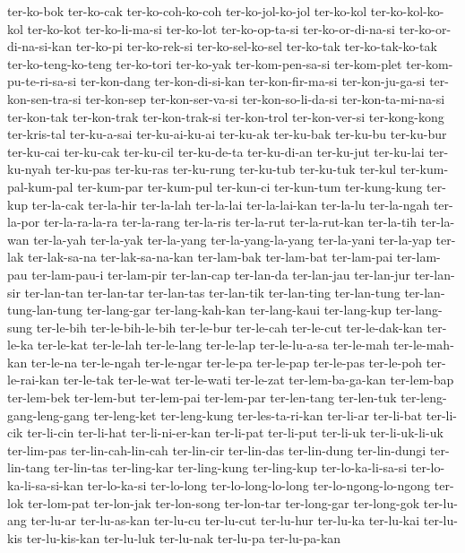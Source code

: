 {ter-ko-bok ter-ko-cak ter-ko-coh-ko-coh ter-ko-jol-ko-jol ter-ko-kol
ter-ko-kol-ko-kol ter-ko-kot ter-ko-li-ma-si ter-ko-lot ter-ko-op-ta-si
ter-ko-or-di-na-si ter-ko-or-di-na-si-kan ter-ko-pi ter-ko-rek-si
ter-ko-sel-ko-sel ter-ko-tak ter-ko-tak-ko-tak ter-ko-teng-ko-teng
ter-ko-tori ter-ko-yak ter-kom-pen-sa-si ter-kom-plet
ter-kom-pu-te-ri-sa-si ter-kon-dang ter-kon-di-si-kan ter-kon-fir-ma-si
ter-kon-ju-ga-si ter-kon-sen-tra-si ter-kon-sep ter-kon-ser-va-si
ter-kon-so-li-da-si ter-kon-ta-mi-na-si ter-kon-tak ter-kon-trak
ter-kon-trak-si ter-kon-trol ter-kon-ver-si ter-kong-kong ter-kris-tal
ter-ku-a-sai ter-ku-ai-ku-ai ter-ku-ak ter-ku-bak ter-ku-bu ter-ku-bur
ter-ku-cai ter-ku-cak ter-ku-cil ter-ku-de-ta ter-ku-di-an ter-ku-jut
ter-ku-lai ter-ku-nyah ter-ku-pas ter-ku-ras ter-ku-rung ter-ku-tub
ter-ku-tuk ter-kul ter-kum-pal-kum-pal ter-kum-par ter-kum-pul ter-kun-ci
ter-kun-tum ter-kung-kung ter-kup ter-la-cak ter-la-hir ter-la-lah
ter-la-lai ter-la-lai-kan ter-la-lu ter-la-ngah ter-la-por ter-la-ra-la-ra
ter-la-rang ter-la-ris ter-la-rut ter-la-rut-kan ter-la-tih ter-la-wan
ter-la-yah ter-la-yak ter-la-yang ter-la-yang-la-yang ter-la-yani
ter-la-yap ter-lak ter-lak-sa-na ter-lak-sa-na-kan ter-lam-bak ter-lam-bat
ter-lam-pai ter-lam-pau ter-lam-pau-i ter-lam-pir ter-lan-cap ter-lan-da
ter-lan-jau ter-lan-jur ter-lan-sir ter-lan-tan ter-lan-tar ter-lan-tas
ter-lan-tik ter-lan-ting ter-lan-tung ter-lan-tung-lan-tung ter-lang-gar
ter-lang-kah-kan ter-lang-kaui ter-lang-kup ter-lang-sung ter-le-bih
ter-le-bih-le-bih ter-le-bur ter-le-cah ter-le-cut ter-le-dak-kan
ter-le-ka ter-le-kat ter-le-lah ter-le-lang ter-le-lap ter-le-lu-a-sa
ter-le-mah ter-le-mah-kan ter-le-na ter-le-ngah ter-le-ngar ter-le-pa
ter-le-pap ter-le-pas ter-le-poh ter-le-rai-kan ter-le-tak ter-le-wat
ter-le-wati ter-le-zat ter-lem-ba-ga-kan ter-lem-bap ter-lem-bek
ter-lem-but ter-lem-pai ter-lem-par ter-len-tang ter-len-tuk
ter-leng-gang-leng-gang ter-leng-ket ter-leng-kung ter-les-ta-ri-kan
ter-li-ar ter-li-bat ter-li-cik ter-li-cin ter-li-hat ter-li-ni-er-kan
ter-li-pat ter-li-put ter-li-uk ter-li-uk-li-uk ter-lim-pas
ter-lin-cah-lin-cah ter-lin-cir ter-lin-das ter-lin-dung ter-lin-dungi
ter-lin-tang ter-lin-tas ter-ling-kar ter-ling-kung ter-ling-kup
ter-lo-ka-li-sa-si ter-lo-ka-li-sa-si-kan ter-lo-ka-si ter-lo-long
ter-lo-long-lo-long ter-lo-ngong-lo-ngong ter-lok ter-lom-pat ter-lon-jak
ter-lon-song ter-lon-tar ter-long-gar ter-long-gok ter-lu-ang ter-lu-ar
ter-lu-as-kan ter-lu-cu ter-lu-cut ter-lu-hur ter-lu-ka ter-lu-kai
ter-lu-kis ter-lu-kis-kan ter-lu-luk ter-lu-nak ter-lu-pa ter-lu-pa-kan
}

